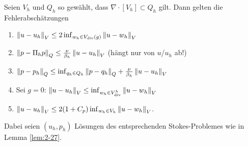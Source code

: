   \begin{lemma}\label{lem:2-28}
    Seien $V_{h}$ und $Q_{h}$ so gewählt, dass $\nabla\cdot
    [V_{h}]\subset Q_{h}$ gilt. Dann gelten die Fehlerabschätzungen
    \begin{enumerate}
    \item $\left \|u- u_{h} \right\|_{V} \leq 2 \inf_{w_{h} \in V_{\operatorname{div}}(g)}
      \left \|u - w_{h} \right\|_{V}$
    \item $\left \|p- \Pi_{h} p \right\|_{Q} \leq \frac \nu {\beta_{h}}
      \left \|u - u_{h} \right\|_{V}$ (hängt nur von $u$/$u_{h}$ ab!)
    \item $\left \|p- p_{h} \right\|_{Q} \leq \inf_{q_{h} \in Q_{h}} \left \|p -
        q_{h} \right\|_{Q} + \frac \nu {\beta_{h}} \left \|u - u_{h} \right\|_{V}$
    \item Sei $g = 0$: $\left \|u- u_{h} \right\|_{V} \leq \inf_{w_{h} \in
        V_{\operatorname{div}}^{h}} \left \|u - w_{h} \right\|_{V}$
    \item $\left \|u - u_{h} \right\|_{V} \leq 2 (1 + C_{p}) \inf_{w_{h} \in
        V_{h}} \left \|u-w_{h} \right\|_{V}$.
    \end{enumerate}
    Dabei seien $(u_{h}, p_{h})$ Lösungen des entsprechenden
    Stokes-Problemes wie in Lemma \ref{lem:2-27}.
  \end{lemma}

